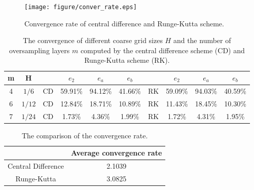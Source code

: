 \documentclass[preprint,12pt]{elsarticle}
\begin{document}
\begin{figure}[H]
     \centering
     \texttt{[image: figure/conver\_rate.eps]}
     \caption{Convergence rate of central difference and Runge-Kutta scheme.}
     \label{fig:f0111}
 \end{figure}
 \begin{table}[H]
\centering
\begin{tabular}{c c| c|c c c |c |c c c}
m &H&~& $e_2$&$e_a$&$e_b$&~& $e_2$&$e_a$&$e_b$ \\
\hline
4&$1/6$ &CD&59.91\% & 94.12\%&41.66\% &RK&59.09\%&94.03\%&40.59\%\\
\hline
6&$1/12$ &CD&12.84\% &18.71\%&10.89\%&RK&11.43\%&18.45\%&10.30\%\\
\hline
7& $1/24$ &CD& 1.73\%&4.36\% &1.99\%&RK&1.72\%&4.31\%&1.95\%\\
\hline
\end{tabular}
\caption{The convergence of different coarse grid sizes $H$ and the number of oversampling layers $m$ computed by the central difference scheme (CD) and Runge-Kutta scheme (RK).}
 \label{tablee2}
\end{table}
\begin{table}[H]
\centering
\begin{tabular}{c|c}
~ &  Average convergence rate \\
\hline
Central Difference& 2.1039 \\
\hline
Runge-Kutta &  3.0825 \\
\hline
\end{tabular}
\caption{The comparison of the convergence rate.}
 \label{tableMK2}
\end{table}
\end{document}
